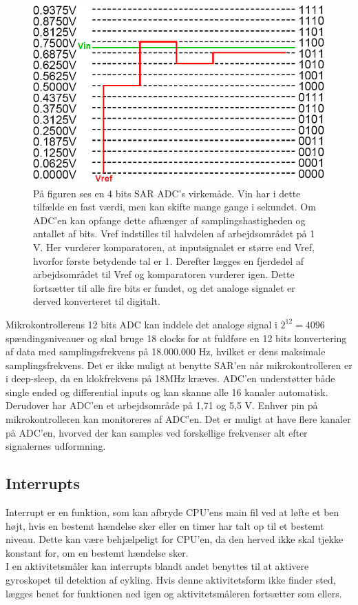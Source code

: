 \begin{figure}[H]
	\centering
	\includegraphics[scale=0.6]{figures/bProblemloesning/SAR_ADC.png}
	\caption{På figuren ses en 4 bits SAR ADC's virkemåde. Vin har i dette tilfælde en fast værdi, men kan skifte mange gange i sekundet. Om ADC'en kan opfange dette afhænger af samplingshastigheden og antallet af bits. Vref indstilles til halvdelen af arbejdsområdet på 1 V. Her vurderer komparatoren, at inputsignalet er større end Vref, hvorfor første betydende tal er 1. Derefter lægges en fjerdedel af arbejdsområdet til Vref og komparatoren vurderer igen. Dette fortsætter til alle fire bits er fundet, og det analoge signalet er derved konverteret til digitalt.}
	\label{fig:SAR_ADC}
\end{figure}\vspace{-0.5cm}
Mikrokontrollerens 12 bits ADC kan inddele det analoge signal i $2^{12} = 4096$ spændingsniveauer og skal bruge 18 clocks for at fuldføre en 12 bits konvertering af data med samplingsfrekvens på 18.000.000 Hz, hvilket er dens maksimale samplingsfrekvens. Det er ikke muligt at benytte SAR'en når mikrokontrolleren er i deep-sleep, da en klokfrekvens på 18MHz kræves. \newline 
ADC'en understøtter både single ended og differential inputs og kan skanne alle 16 kanaler automatisk.  Derudover har ADC'en et arbejdsområde på 1,71 og 5,5 V. Enhver pin på mikrokontrolleren kan monitoreres af ADC'en. Det er muligt at have flere kanaler på ADC'en, hvorved der kan samples ved forskellige frekvenser alt efter signalernes udformning. \citep{Semiconductor20164200M}

\subsection{Interrupts}
Interrupt er en funktion, som kan afbryde CPU'ens main fil ved at løfte et ben højt, hvis en bestemt hændelse sker eller en timer har talt op til et bestemt niveau. Dette kan være behjælpeligt for CPU'en, da den herved ikke skal tjekke konstant for, om en bestemt hændelse sker. \citep{Badiger2016} \\
I en aktivitetsmåler kan interrupts blandt andet benyttes til at aktivere gyroskopet til detektion af cykling. Hvis denne aktivitetsform ikke finder sted, lægges benet for funktionen ned igen og aktivitetsmåleren fortsætter som ellers.

